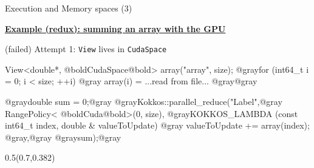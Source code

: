 \begin{frame}[fragile]{Execution and Memory spaces (3)}

  \ul{\textbf{Example (redux): summing an array with the GPU}}

  \vspace{7pt}

  \hspace{10pt}(failed) Attempt 1: \texttt{View} lives in \texttt{CudaSpace}

  \vspace{3pt}

  \begin{code}[linebackgroundcolor={
        \btLstHL<2->{3}{red!20}
      },
      keywords={}]
View<double*, @boldCudaSpace@bold> array("array", size);
@grayfor (int64_t i = 0; i < size; ++i) {@gray
  array(i) = ...read from file...
@gray}@gray

@graydouble sum = 0;@gray
@grayKokkos::parallel_reduce("Label",@gray
  RangePolicy< @boldCuda@bold>(0, size),
  @grayKOKKOS_LAMBDA (const int64_t index, double & valueToUpdate) {@gray
    valueToUpdate += array(index);
  @gray},@gray
  @graysum);@gray
  \end{code}

  \vspace{11pt}

  \begin{textblock*}{0.5\textwidth}(0.7\textwidth,0.382\textheight)
  \end{textblock*}

  \vspace{26pt}

\end{frame}


